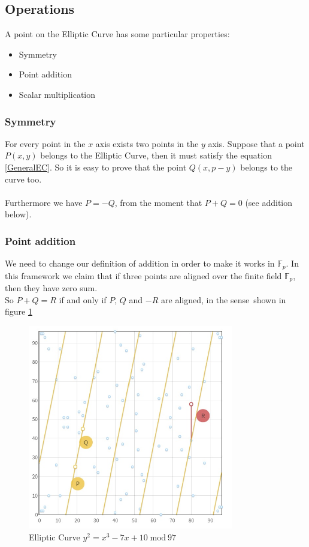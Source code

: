 \subsection{Operations}
A point on the Elliptic Curve has some particular properties:
\begin{itemize}
	\item Symmetry
	\item Point addition
	\item Scalar multiplication
\end{itemize}

\subsubsection{Symmetry}
For every point in the $x$ axis exists two points in the $y$ axis. Suppose that a point $P(x,y)$ belongs to the Elliptic Curve, then it must satisfy the equation \ref{GeneralEC}.
So it is easy to prove that the point $Q(x,p-y)$ belongs to the curve too. \\ \\
Furthermore we have $P=-Q$, from the moment that $P+Q=0$ (see addition below).

\subsubsection{Point addition}
We need to change our definition of addition in order to make it works in $\mathbb{F}_p$. 
In this framework we claim that if three points are aligned over the finite field $\mathbb{F}_p$, then they have zero sum. \\
So $P+Q=R$ if and only if $P$, $Q$ and $-R$ are aligned, in the sense\ shown in figure \ref{fig:EC_aligned}
\begin{figure}[ht!]
	\centering
	\includegraphics[width=9cm]{Figures/EC_aligned.jpg}
	\caption{Elliptic Curve $y^2=x^3-7x+10 \; \textrm{mod} \ 97$}
	\label{fig:EC_aligned}
\end{figure}


